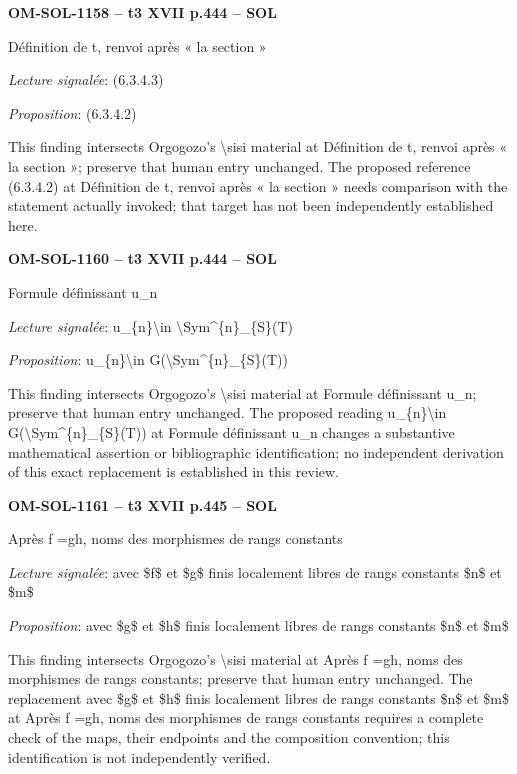 \par\noindent\textbf{OM-SOL-1158 -- t3 XVII p.444 -- SOL}\par
Définition de t, renvoi après « la section »\par
\emph{Lecture signalée}: (6.3.4.3)\par
\emph{Proposition}: (6.3.4.2)\par
This finding intersects Orgogozo's \textbackslash{}sisi material at Définition de t, renvoi après « la section »; preserve that human entry unchanged. The proposed reference (6.3.4.2) at Définition de t, renvoi après « la section » needs comparison with the statement actually invoked; that target has not been independently established here.\par
\par\noindent\textbf{OM-SOL-1160 -- t3 XVII p.444 -- SOL}\par
Formule définissant u\_n\par
\emph{Lecture signalée}: u\_\{n\}\textbackslash{}in \textbackslash{}Sym\textasciicircum{}\{n\}\_\{S\}(T)\par
\emph{Proposition}: u\_\{n\}\textbackslash{}in G(\textbackslash{}Sym\textasciicircum{}\{n\}\_\{S\}(T))\par
This finding intersects Orgogozo's \textbackslash{}sisi material at Formule définissant u\_n; preserve that human entry unchanged. The proposed reading u\_\{n\}\textbackslash{}in G(\textbackslash{}Sym\textasciicircum{}\{n\}\_\{S\}(T)) at Formule définissant u\_n changes a substantive mathematical assertion or bibliographic identification; no independent derivation of this exact replacement is established in this review.\par
\par\noindent\textbf{OM-SOL-1161 -- t3 XVII p.445 -- SOL}\par
Après f =\allowbreak  gh, noms des morphismes de rangs constants\par
\emph{Lecture signalée}: avec \$f\$ et \$g\$ finis localement libres de rangs constants \$n\$ et \$m\$\par
\emph{Proposition}: avec \$g\$ et \$h\$ finis localement libres de rangs constants \$n\$ et \$m\$\par
This finding intersects Orgogozo's \textbackslash{}sisi material at Après f =\allowbreak  gh, noms des morphismes de rangs constants; preserve that human entry unchanged. The replacement avec \$g\$ et \$h\$ finis localement libres de rangs constants \$n\$ et \$m\$ at Après f =\allowbreak  gh, noms des morphismes de rangs constants requires a complete check of the maps, their endpoints and the composition convention; this identification is not independently verified.\par
